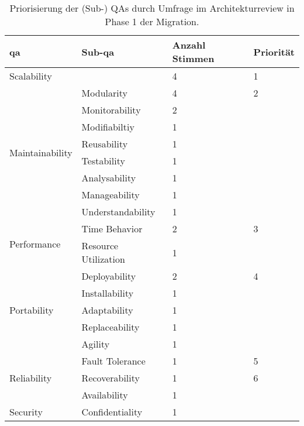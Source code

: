 \begin{table}
  \centering
  \begin{tabular}{m{2.6cm} m{3.2cm} m{1.3cm} m{1.3cm}}
    \toprule
    \textbf{\gls{qa}} & \textbf{Sub-\gls{qa}} & \textbf{Anzahl Stimmen} & \textbf{Priorität} \\ \midrule
    Scalability & & 4 & 1\\ \hline

    \multirow{8}{=}[-0.1cm]{Maintainability} & Modularity & 4 & 2 \\
    & Monitorability & 2 & \\
    & Modifiabiltiy & 1 &  \\
    & Reusability & 1 &  \\
    & Testability & 1 &  \\
    & Analysability & 1 &  \\
    & Manageability & 1 &  \\
    & Understandability & 1 &  \\ \hline

    \multirow{2}{=}[-0.05cm]{Performance} & Time Behavior & 2 & 3 \\
    & Resource Utilization & 1 &  \\ \hline

   \multirow{5}{=}[-0.1cm]{Portability} & Deployability & 2 & 4 \\
   & Installability & 1 &  \\
   & Adaptability & 1 &  \\
   & Replaceability & 1 &  \\
   & Agility & 1 &  \\ \hline

    \multirow{3}{=}[-0cm]{Reliability} & Fault Tolerance & 1 & 5 \\
    & Recoverability & 1 & 6 \\
    & Availability & 1 &  \\ \hline

    Security & Confidentiality & 1 &  \\
    \bottomrule
  \end{tabular}
  \caption[Priorisierung der (Sub-) QAs durch Umfrage im Architekturreview]{
    Priorisierung der (Sub-) QAs durch Umfrage im Architekturreview in Phase 1 der Migration.
  }
  \label{tab:phase1-qas-priority}
\end{table}
